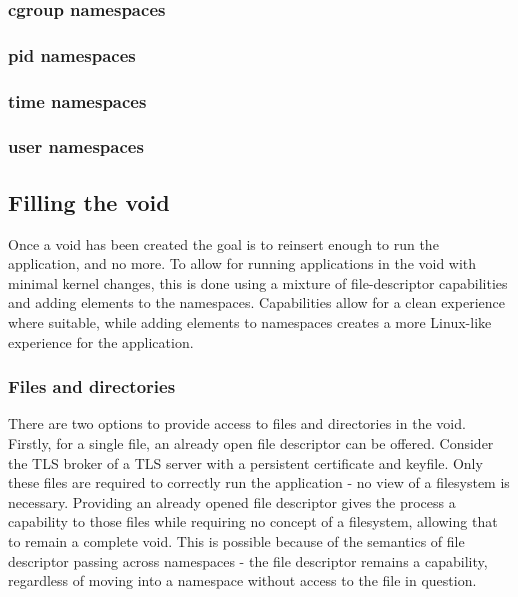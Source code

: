 \documentclass[sigplan]{acmart}
\begin{document}
\subsubsection{cgroup namespaces}


\subsubsection{pid namespaces}


\subsubsection{time namespaces}


\subsubsection{user namespaces}


\subsection{Filling the void}

Once a void has been created the goal is to reinsert enough to run the application, and no more. To allow for running applications in the void with minimal kernel changes, this is done using a mixture of file-descriptor capabilities and adding elements to the namespaces. Capabilities allow for a clean experience where suitable, while adding elements to namespaces creates a more Linux-like experience for the application.

\subsubsection{Files and directories} There are two options to provide access to files and directories in the void. Firstly, for a single file, an already open file descriptor can be offered. Consider the TLS broker of a TLS server with a persistent certificate and keyfile. Only these files are required to correctly run the application - no view of a filesystem is necessary. Providing an already opened file descriptor gives the process a capability to those files while requiring no concept of a filesystem, allowing that to remain a complete void. This is possible because of the semantics of file descriptor passing across namespaces - the file descriptor remains a capability, regardless of moving into a namespace without access to the file in question.
\end{document}
